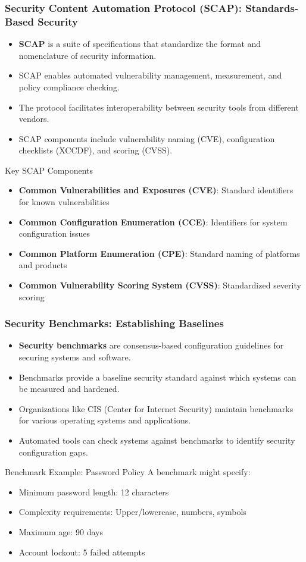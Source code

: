 \documentclass{beamer}
\begin{document}
\begin{frame}
\frametitle{Security Content Automation Protocol (SCAP): Standards-Based Security}
\begin{itemize}
\item \textbf{SCAP} is a suite of specifications that standardize the format and nomenclature of security information.
\item SCAP enables automated vulnerability management, measurement, and policy compliance checking.
\item The protocol facilitates interoperability between security tools from different vendors.
\item SCAP components include vulnerability naming (CVE), configuration checklists (XCCDF), and scoring (CVSS).
\end{itemize}

\begin{alertblock}{Key SCAP Components}
\scriptsize
\begin{itemize}
\item \textbf{Common Vulnerabilities and Exposures (CVE)}: Standard identifiers for known vulnerabilities
\item \textbf{Common Configuration Enumeration (CCE)}: Identifiers for system configuration issues
\item \textbf{Common Platform Enumeration (CPE)}: Standard naming of platforms and products
\item \textbf{Common Vulnerability Scoring System (CVSS)}: Standardized severity scoring
\end{itemize}
\end{alertblock}
\end{frame}

\begin{frame}
\frametitle{Security Benchmarks: Establishing Baselines}
\begin{itemize}
\item \textbf{Security benchmarks} are consensus-based configuration guidelines for securing systems and software.
\item Benchmarks provide a baseline security standard against which systems can be measured and hardened.
\item Organizations like CIS (Center for Internet Security) maintain benchmarks for various operating systems and applications.
\item Automated tools can check systems against benchmarks to identify security configuration gaps.
\end{itemize}

\begin{exampleblock}{Benchmark Example: Password Policy}
\scriptsize
A benchmark might specify:
\begin{itemize}
\item Minimum password length: 12 characters
\item Complexity requirements: Upper/lowercase, numbers, symbols
\item Maximum age: 90 days
\item Account lockout: 5 failed attempts
\end{itemize}
\end{exampleblock}
\end{frame}
\end{document}
